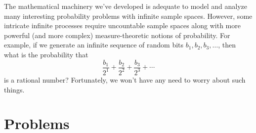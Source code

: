 The mathematical machinery we've developed is adequate to model and
analyze many interesting probability problems with infinite sample
spaces.  However, some intricate infinite processes require
uncountable sample spaces along with more powerful (and more complex)
measure-theoretic notions of probability.  For example, if we generate
an infinite sequence of random bits $b_1, b_2, b_3, \ldots$, then what
is the probability that
\[
\frac{b_1}{2^1} + \frac{b_2}{2^2} + \frac{b_3}{2^3} + \cdots
\]
is a rational number?  Fortunately, we won't have any need to worry about
such things.


\begin{problems}
\classproblems
{}
\end{problems}

\section{Problems}

\endinput
